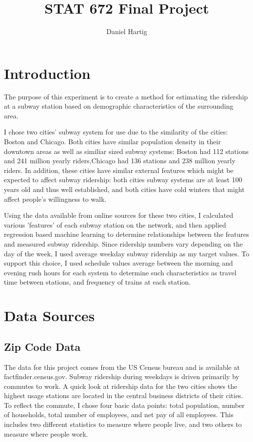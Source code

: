 \documentclass{article}
\title{STAT 672 Final Project}
\author{Daniel Hartig}
\begin{document}
\maketitle

\section{Introduction}

The purpose of this experiment is to create a method for estimating the ridership at a subway station based on demographic characteristics of the surrounding area. 

I chose two cities' subway system for use due to the similarity of the cities: Boston and Chicago. Both cities have similar population density in their downtown areas as well as similiar sized subway systems: Boston had 112 stations and 241 million yearly riders,Chicago had 136 stations and 238 million yearly riders. In addition, these cities have similar external features which might be expected to affect subway ridership: both cities subway systems are at least 100 years old and thus well established, and both cities have cold winters that might affect people's willingness to walk. 

Using the data available from online sources for these two cities, I calculated various 'features' of each subway station on the network, and then applied regression based machine learning to determine relationships between the features and measured subway ridership. Since ridership numbers vary depending on the day of the week, I used average weekday subway ridership as my target values. To support this choice, I used schedule values average between the morning and evening rush hours for each system to determine such characteristics as travel time between stations, and frequency of trains at each station. 

\section{Data Sources}

\subsection{Zip Code Data}

The data for this project comes from the US Census bureau and is available at factfinder.census.gov. Subway ridership during weekdays is driven primarily by commutes to work. A quick look at ridership data for the two cities shows the highest usage stations are located in the central business districts of their cities. To reflect the commute, I chose four basic data points: total population, number of households, total number of employees, and net pay of all employees. This includes two different statistics to measure where people live, and two others to measure where people work. 
\end{document}
